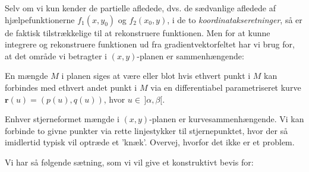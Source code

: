 Selv om vi kun kender de partielle afledede, dvs. de sædvanlige afledede af hjælpefunktionerne $f_{1}(x,y_{0})$ og $f_{2}(x_{0},y)$,  i de to \emph{koordinatakseretninger}, så er de faktisk tilstrækkelige til at rekonstruere funktionen. Men for at kunne integrere og rekonstruere funktionen ud fra gradientvektorfeltet har vi brug for, at det område vi betragter i $(x,y)$-planen er sammenhængende:

\begin{definition}
En mængde $M$ i planen siges at være  eller blot  hvis ethvert punkt i $M$ kan forbindes med ethvert andet punkt i $M$ via en differentiabel parametriseret  kurve $\mathbf{r}(u) = (p(u), q(u))$, hvor $u \in \, ]\alpha, \beta[$.
\end{definition}

\begin{example}
Enhver stjerneformet mængde i $(x,y)$-planen er kurvesammenhængende. Vi kan forbinde to givne punkter via rette linjestykker til stjernepunktet, hvor der så imidlertid typisk vil optræde et 'knæk'. Overvej, hvorfor det ikke er et problem.
\end{example}


Vi har så følgende sætning, som vi vil give et konstruktivt bevis for:


